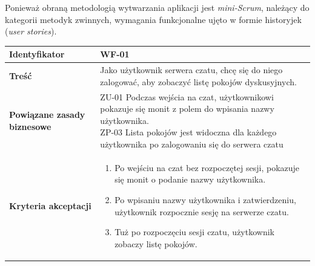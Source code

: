 \documentclass[11pt,oneside,a4paper,titlepage,onecolumn]{article}
\newenvironment{enumreq}
{ \begin{enumerate}[topsep=0pt,itemsep=-1ex,partopsep=1ex,parsep=1ex] }
{ \end{enumerate}                  }
\begin{document}
Ponieważ obraną metodologią wytwarzania aplikacji jest \textit{mini-Scrum}, należący do kategorii metodyk zwinnych, wymagania funkcjonalne ujęto w formie historyjek (\textit{user stories}).

\vspace{2em} 

\begin{tabular}{ | l | l | }
	\hline
		\textbf{Identyfikator} & 
		WF-01
		\\
		
	\hline
		\textbf{Treść} & \parbox[t]{11cm}{
			Jako użytkownik serwera czatu, chcę się do niego zalogować, aby zobaczyć listę pokojów dyskusyjnych.
		}\\
		 
	\hline
		\parbox[t]{4cm}{\textbf{Powiązane zasady biznesowe}} & \parbox[t]{11cm}{
			ZU-01 Podczas wejścia na czat, użytkownikowi pokazuje się monit z polem do wpisania nazwy użytkownika. \\
			ZP-03 Lista pokojów jest widoczna dla każdego użytkownika
			po zalogowaniu się do serwera czatu
		}\\
		
	\hline
		\parbox[t]{4cm}{\textbf{Kryteria akceptacji}} & \parbox[t]{11cm}{
			\begin{enumreq}
				\item Po wejściu na czat bez rozpoczętej sesji, pokazuje się monit o podanie nazwy użytkownika.
				\item Po wpisaniu nazwy użytkownika i zatwierdzeniu, użytkownik rozpocznie sesję na serwerze czatu.
				\item Tuż po rozpoczęciu sesji czatu, użytkownik zobaczy listę pokojów.
			\end{enumreq}
			}
		\\

	\hline
\end{tabular}

\vspace{2em} 
\end{document}
